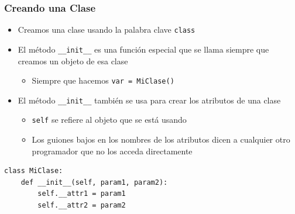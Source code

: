 \documentclass[11pt]{beamer}
\begin{document}
\begin{frame}[fragile]\frametitle{Creando una Clase}
\begin{itemize}
\item Creamos una clase usando la palabra clave \lstinline|class|
\item El método \lstinline|__init__| es una función especial que se llama siempre que creamos un objeto de esa clase
    \begin{itemize}
    \item Siempre que hacemos \lstinline|var = MiClase()|
    \end{itemize}
\item El método \lstinline|__init__| también se usa para crear los atributos de una clase
    \begin{itemize}
    \item \lstinline|self| se refiere al objeto que se está usando
    \item Los guiones bajos en los nombres de los atributos dicen a cualquier otro programador que no los acceda directamente
    \end{itemize}
\end{itemize}
\begin{lstlisting}
class MiClase:
    def __init__(self, param1, param2):
        self.__attr1 = param1
        self.__attr2 = param2
\end{lstlisting}
\end{frame}
\end{document}
